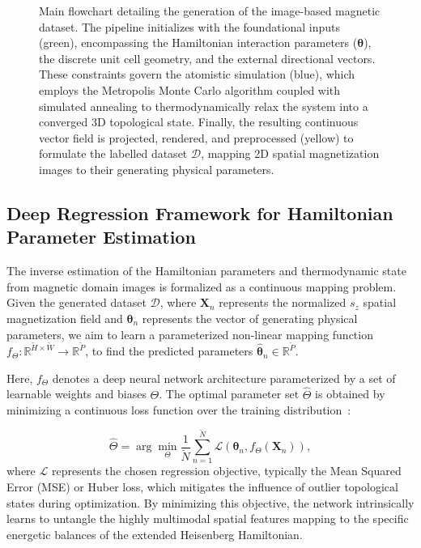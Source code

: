 \documentclass[a4paper,fleqn]{cas-sc}
\begin{document}
\begin{figure}[pos=htbp]
    \centering
    \resizebox{0.8\linewidth}{!}{
    }
 \caption{Main flowchart detailing the generation of the image-based magnetic dataset. The pipeline initializes with the foundational inputs (green), encompassing the Hamiltonian interaction parameters ($\boldsymbol{\theta}$), the discrete unit cell geometry, and the external directional vectors. These constraints govern the atomistic simulation (blue), which employs the Metropolis Monte Carlo algorithm coupled with simulated annealing to thermodynamically relax the system into a converged 3D topological state. Finally, the resulting continuous vector field is projected, rendered, and preprocessed (yellow) to formulate the labelled dataset $\mathcal{D}$, mapping 2D spatial magnetization images to their generating physical parameters.}
    \label{fig:methodology_flowchart}
\end{figure}

\subsection{Deep Regression Framework for Hamiltonian Parameter Estimation}\label{sec:Deep_Learning}

The inverse estimation of the Hamiltonian parameters and thermodynamic state from magnetic domain images is formalized as a continuous mapping problem. Given the generated dataset $\mathcal{D}$, where $\mathbf{X}_n$ represents the normalized $s_z$ spatial magnetization field and $\boldsymbol{\theta}_n$ represents the vector of generating physical parameters, we aim to learn a parameterized non-linear mapping function $f_\Theta : \mathbb{R}^{\breve{H} \times \breve{W}} \rightarrow \mathbb{R}^{\breve{P}}$, to find the predicted parameters $\hat{\boldsymbol{\theta}}_n\in\mathbb{R}^{\breve{P}}.$

Here, $f_\Theta$ denotes a deep neural network architecture parameterized by a set of learnable weights and biases $\Theta$. The optimal parameter set $\hat{\Theta}$ is obtained by minimizing a continuous loss function over the training distribution~\cite{murphy2023probabilistic}:

\begin{equation}\label{eq:LossFunction}
\hat{\Theta} = \arg\min_{\Theta} \frac{1}{\breve{N}} \sum_{n=1}^{\breve{N}} \mathcal{L}\left(\boldsymbol{\theta}_n, f_\Theta(\mathbf{X}_n)\right),
\end{equation}
where $\mathcal{L}$ represents the chosen regression objective, typically the Mean Squared Error (MSE) or Huber loss, which mitigates the influence of outlier topological states during optimization. By minimizing this objective, the network intrinsically learns to untangle the highly multimodal spatial features mapping to the specific energetic balances of the extended Heisenberg Hamiltonian.
\end{document}
